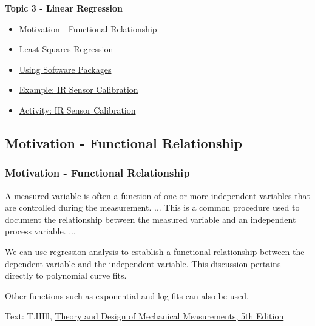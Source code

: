 \documentclass[fleqn]{ltx-talk} %
\newcommand{\sectionIIItitle}{Linear Regression}
\newcommand{\sectionIIIsubsectionItitle}{Motivation - Functional Relationship}
\newcommand{\sectionIIIsubsectionIItitle}{Least Squares Regression}
\newcommand{\sectionIIIsubsectionIIItitle}{Using Software Packages}
\newcommand{\sectionIIIsubsectionIVtitle}{Example: IR Sensor Calibration}
\newcommand{\sectionIIIsubsectionVtitle}{Activity: IR Sensor Calibration}
\begin{document}
		\begin{frame}
			\large \textbf{Topic 3 - \sectionIIItitle} \vspace{3mm}\\

			\begin{itemize}
				\item \hyperref[sectionIIIsubsectionI]{\sectionIIIsubsectionItitle} \vspc %
				\item \hyperref[sectionIIIsubsectionII]{\sectionIIIsubsectionIItitle} \vspc %
				\item \hyperref[sectionIIIsubsectionIII]{\sectionIIIsubsectionIIItitle} \vspc %
				\item \hyperref[sectionIIIsubsectionIV]{\sectionIIIsubsectionIVtitle} \vspc %
				\item \hyperref[sectionIIIsubsectionV]{\sectionIIIsubsectionVtitle} \vspc %
			\end{itemize}

		\end{frame}

		\subsection{\sectionIIIsubsectionItitle}\label{sectionIIIsubsectionI}

			\begin{frame}
				\frametitle{\sectionIIIsubsectionItitle}


A measured variable is often a function of one or more independent variables that are controlled during the measurement. ... This is a common procedure used to document the relationship between the measured variable and an independent process variable. ... \vspccc

We can use {\GR regression} analysis to establish a {\BL functional relationship} between the {\PN dependent} variable and the {\PR independent} variable. This discussion pertains directly to polynomial curve fits.\vspcc

Other functions such as exponential and log fits can also be used.

\vspace{10mm}
{\tiny Text: T.HIll, \underline{Theory and Design of Mechanical Measurements, 5th Edition} }

				
			\end{frame}
\end{document}
